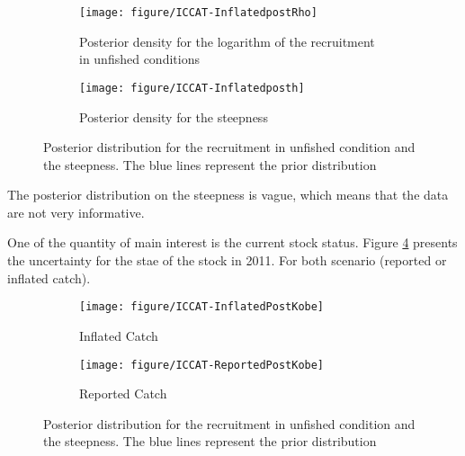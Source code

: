 \begin{figure}[htbp]
 \begin{subfigure}[b]{0.45\textwidth}
 \texttt{[image: figure/ICCAT-InflatedpostRho]}
  \caption{Posterior density for the logarithm of the recruitment in unfished conditions}
                \label{fig:mcmcrho}
  \end{subfigure}
 \begin{subfigure}[b]{0.45\textwidth} 
 \texttt{[image: figure/ICCAT-Inflatedposth]}
\caption{Posterior density for the steepness}
                \label{fig:mcmch}
  \end{subfigure}
  \caption{Posterior distribution for the recruitment in unfished condition and the steepness. The blue lines represent the prior distribution}
  \label{fig:mcmcpost}
 \end{figure}

The posterior distribution on the steepness is vague, which means that the data are not very informative. 

 One of the quantity of main interest is the current  stock status. 
 Figure \ref{fig:postKobe} presents the uncertainty for the stae of the stock in 2011.
 For both scenario (reported or inflated catch).
\begin{figure}[htbp]
 \begin{subfigure}[b]{0.45\textwidth}
 \texttt{[image: figure/ICCAT-InflatedPostKobe]}
  \caption{Inflated Catch}
  \end{subfigure}
 \begin{subfigure}[b]{0.45\textwidth} 
 \texttt{[image: figure/ICCAT-ReportedPostKobe]}
\caption{Reported Catch}
  \end{subfigure}
  \caption{Posterior distribution for the recruitment in unfished condition and the steepness. The blue lines represent the prior distribution}
  \label{fig:postKobe}
 \end{figure}
 
 
